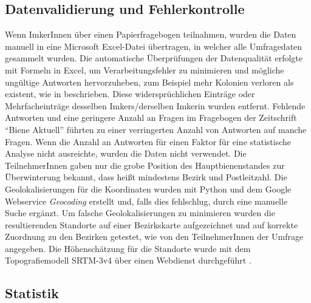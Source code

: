 \subsection{Datenvalidierung und Fehlerkontrolle}

Wenn ImkerInnen über einen Papierfragebogen teilnahmen, wurden die Daten manuell in eine Microsoft Excel-Datei übertragen, in welcher alle Umfragedaten gesammelt wurden. Die automatische Überprüfungen der Datenqualität erfolgte mit Formeln in Excel, um Verarbeitungsfehler zu minimieren und mögliche ungültige Antworten hervorzuheben, zum Beispiel mehr Kolonien verloren als existent, wie in \cite{vanderzee2013, brodschneider2013} beschrieben. Diese widersprüchlichen Einträge oder Mehrfacheinträge desselben Imkers/derselben Imkerin wurden entfernt. Fehlende Antworten und eine geringere Anzahl an Fragen im Fragebogen der Zeitschrift \enquote{Biene Aktuell} führten zu einer verringerten Anzahl von Antworten auf manche Fragen. Wenn die Anzahl an Antworten für einen Faktor für eine statistische Analyse nicht ausreichte, wurden die Daten nicht verwendet.
\newline
Die TeilnehmerInnen gaben nur die grobe Position des Hauptbienenstandes zur Überwinterung bekannt, dass heißt mindestens Bezirk und Postleitzahl. Die Geolokalisierungen für die Koordinaten wurden mit Python und dem Google Webservice \emph{Geocoding} erstellt und, falls dies fehlschlug, durch eine manuelle Suche ergänzt. Um falsche Geolokalisierungen zu minimieren wurden die resultierenden Standorte  auf einer Bezirkskarte aufgezeichnet und auf korrekte Zuordnung zu den Bezirken getestet, wie von den TeilnehmerInnen der Umfrage angegeben. Die Höhenschätzung für die Standorte wurde mit dem Topografiemodell SRTM-3v4 über einen Webdienst durchgeführt \citep{geonames}.

\subsection{Statistik}


